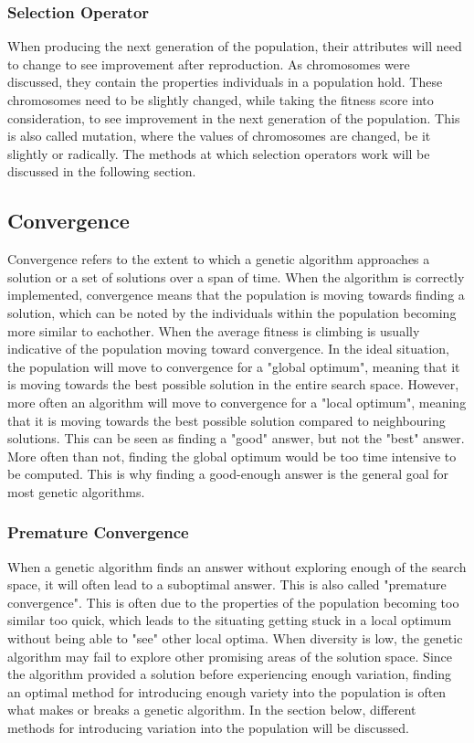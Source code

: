 \documentclass{article}
\begin{document}
\bigbreak
\subsubsection{Selection Operator}
When producing the next generation of the population, their attributes will need to change to see improvement after reproduction. As chromosomes were discussed, they contain the properties individuals in a population hold. These chromosomes need to be slightly changed, while taking the fitness score into consideration, to see improvement in the next generation of the population. This is also called mutation, where the values of chromosomes are changed, be it slightly or radically. The methods at which selection operators work will be discussed in the following section.

\bigskip
\subsection{Convergence}
Convergence refers to the extent to which a genetic algorithm approaches a solution or a set of solutions over a span of time.
When the algorithm is correctly implemented, convergence means that the population is moving towards finding a solution, which can be noted by the individuals within the population becoming more similar to eachother. When the average fitness is climbing is usually indicative of the population moving toward convergence.
\smallbreak
In the ideal situation, the population will move to convergence for a "global optimum", meaning that it is moving towards the best possible solution in the entire search space. However, more often an algorithm will move to convergence for a "local optimum", meaning that it is moving towards the best possible solution compared to neighbouring solutions. This can be seen as finding a "good" answer, but not the "best" answer. More often than not, finding the global optimum would be too time intensive to be computed. This is why finding a good-enough answer is the general goal for most genetic algorithms.

\bigskip
\subsubsection{Premature Convergence}
When a genetic algorithm finds an answer without exploring enough of the search space, it will often lead to a suboptimal answer. This is also called "premature convergence". This is often due to the properties of the population becoming too similar too quick, which leads to the situating getting stuck in a local optimum without being able to "see" other local optima. When diversity is low, the genetic algorithm may fail to explore other promising areas of the solution space. \smallbreak Since the algorithm provided a solution before experiencing enough variation, finding an optimal method for introducing enough variety into the population is often what makes or breaks a genetic algorithm. In the section below, different methods for introducing variation into the population will be discussed.  
\end{document}
